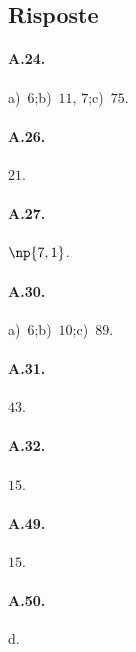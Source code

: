 \subsection{Risposte}
\begin{multicols}{2}
 \paragraph{A.24.}
a)~$6$;\quad b)~$11$, $7$;\quad c)~$75$.

\paragraph{A.26.} $21$.

\paragraph{A.27.} $\np{7,1}$.

\paragraph{A.30.}
a)~$6$;\quad b)~$10$;\quad c)~$89$.

\paragraph{A.31.} $43$.

\paragraph{A.32.} $15$.

\paragraph{A.49.} $15$.

\paragraph{A.50.} d.
\end{multicols}

